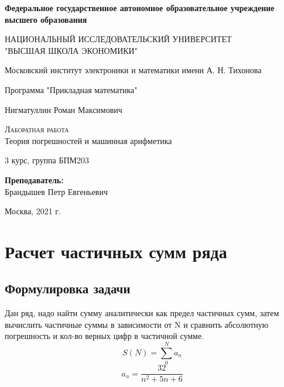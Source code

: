 \documentclass[a4paper,12pt]{article}
\begin{document}
\begin{titlepage}
  \begin{center}
    \large
     
    \textbf{Федеральное государственное автономное образовательное учреждение высшего образования}
    \vspace{0.5cm}
 
    НАЦИОНАЛЬНЫЙ ИССЛЕДОВАТЕЛЬСКИЙ УНИВЕРСИТЕТ \\ "ВЫСШАЯ ШКОЛА ЭКОНОМИКИ"
    \vspace{0.5cm}
     
    Московский институт электроники и математики имени А. Н. Тихонова 
     
    Программа "Прикладная математика"
    \vfill
     
     
    Нигматуллин Роман Максимович
    \vfill
 
    \textsc{Лаборатная работа}\\[5mm]
     
    {\LARGE Теория погрешностей и машинная арифметика\\[2mm]
    }
  \bigskip
     
    3 курс, группа БПМ203
\end{center}
\vfill
 

 
\hfill\begin{flushright}
  \textbf{Преподаватель:}\\
  Брандышев Петр Евгеньевич
\end{flushright}%
\vfill
 
\begin{center}
  Москва, 2021 г.
\end{center}
\end{titlepage}


\tableofcontents

\section{Расчет частичных сумм ряда}
\subsection{Формулировка задачи}
Дан ряд, надо найти сумму аналитически как предел частичных сумм, затем вычислить частичные суммы в зависимости от N и сравнить абсолютную погрешность и кол-во верных цифр в частичной сумме.
   $$S(N) = \sum_0^N a_n$$
   $$a_n = \frac{32}{n^2 +5n + 6}$$
   
\end{document}
